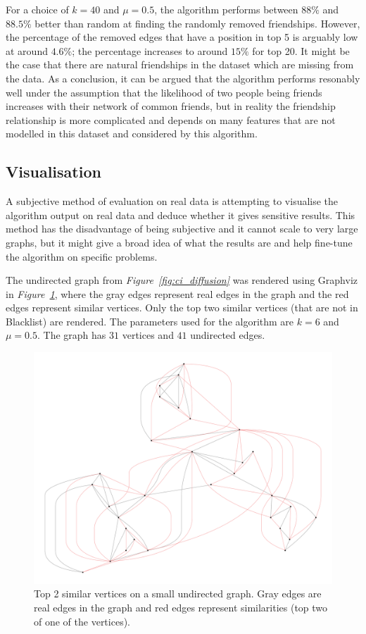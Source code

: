 \documentclass[12pt]{report}
\begin{document}
For a choice of $k=40$ and $\mu=0.5$, the algorithm performs between $88\%$ and
$88.5\%$ better than random at finding the randomly removed friendships. However,
the percentage of the removed edges that have a position in top 5 is arguably
low at around $4.6\%$; the percentage increases to around $15\%$ for top 20. It
might be the case that there are natural friendships in the dataset which are
missing from the data. As a conclusion, it can be argued that the algorithm
performs resonably well under the assumption that the likelihood of two people
being friends increases with their network of common friends, but in reality
the friendship relationship is more complicated and depends on many features
that are not modelled in this dataset and considered by this algorithm.



%
\subsection{Visualisation}
%
A subjective method of evaluation on real data is attempting to visualise the
algorithm output on real data and deduce whether it gives sensitive results.
This method has the disadvantage of being subjective and it cannot scale to very
large graphs, but it might give a broad idea of what the results are and help
fine-tune the algorithm on specific problems.

The undirected graph from \emph{Figure~\ref{fig:ci_diffusion}} was rendered
using Graphviz in \emph{Figure~\ref{fig:visual_first}}, where the gray edges
represent real edges in the graph and the red edges represent similar vertices.
Only the top two similar vertices (that are not in Blacklist) are rendered. The
parameters used for the algorithm are $k=6$ and $\mu=0.5$. The graph has $31$
vertices and $41$ undirected edges.

\begin{figure}[tbp]
  \includegraphics[width=\textwidth]{visual_first}
  \caption{Top 2 similar vertices on a small undirected graph. Gray edges are
  real edges in the graph and red edges represent similarities (top two of one
  of the vertices).}
  \label{fig:visual_first}
\end{figure}
\end{document}
